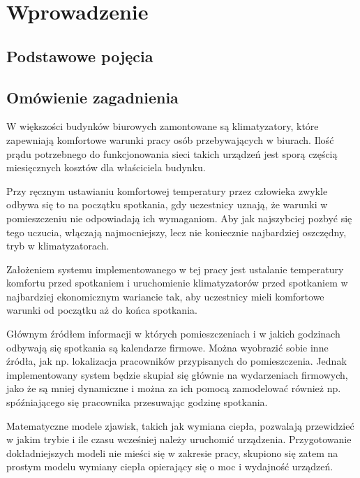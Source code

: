 \chapter{Wprowadzenie}
\section{Podstawowe pojęcia}




\section{Omówienie zagadnienia}
W większości budynków biurowych zamontowane są klimatyzatory, które zapewniają komfortowe warunki pracy osób przebywających w biurach. 
Ilość prądu potrzebnego do funkcjonowania sieci takich urządzeń jest sporą częścią miesięcznych kosztów dla właściciela budynku.

Przy ręcznym ustawianiu komfortowej temperatury przez człowieka zwykle odbywa się to na początku spotkania, gdy uczestnicy uznają, że warunki w pomieszczeniu nie odpowiadają ich wymaganiom. Aby jak najszybciej pozbyć się tego uczucia, włączają najmocniejszy, lecz nie koniecznie najbardziej oszczędny, tryb w klimatyzatorach.

Założeniem systemu implementowanego w tej pracy jest ustalanie temperatury komfortu przed spotkaniem i uruchomienie klimatyzatorów przed spotkaniem w najbardziej ekonomicznym wariancie tak, aby uczestnicy mieli komfortowe warunki od początku aż do końca spotkania. 

Głównym źródłem informacji w których pomieszczeniach i w jakich godzinach odbywają się spotkania są kalendarze firmowe. Można wyobrazić sobie inne źródła, jak np. lokalizacja pracowników przypisanych do pomieszczenia. Jednak implementowany system będzie skupiał się głównie na wydarzeniach firmowych, jako że są mniej dynamiczne i można za ich pomocą zamodelować również np. spóźniającego się pracownika przesuwając godzinę spotkania.

Matematyczne modele zjawisk, takich jak wymiana ciepła, pozwalają przewidzieć w jakim trybie i ile czasu wcześniej należy uruchomić urządzenia. Przygotowanie dokładniejszych modeli nie mieści się w zakresie pracy, skupiono się zatem na prostym modelu wymiany ciepła opierający się o moc i wydajność urządzeń.


